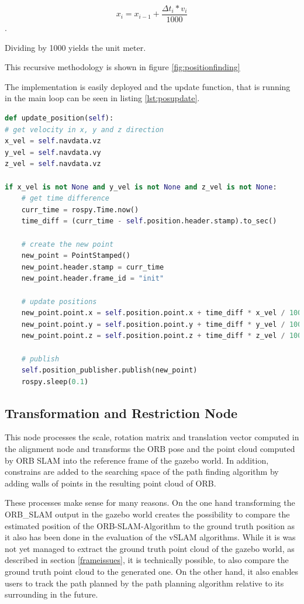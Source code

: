 	$$x_{i} = x_{i-1} + \frac{\Delta t_i * v_i}{1000} $$. 
	
	Dividing by 1000 yields the unit meter. 
	
	This recursive methodology is shown in figure \ref{fig:positionfinding}
	
	
	The implementation is easily deployed and the update function, that is running in the main loop can be seen in listing \ref{lst:posupdate}. 
	
	\begin{lstlisting}[language=python, caption=Main part of the position estimation node, label=lst:posupdate]
	def update_position(self):
# get velocity in x, y and z direction
x_vel = self.navdata.vz
y_vel = self.navdata.vy
z_vel = self.navdata.vz

if x_vel is not None and y_vel is not None and z_vel is not None:
	# get time difference
	curr_time = rospy.Time.now()
	time_diff = (curr_time - self.position.header.stamp).to_sec()
	
	# create the new point
	new_point = PointStamped()
	new_point.header.stamp = curr_time
	new_point.header.frame_id = "init"
	
	# update positions
	new_point.point.x = self.position.point.x + time_diff * x_vel / 1000
	new_point.point.y = self.position.point.y + time_diff * y_vel / 1000
	new_point.point.z = self.position.point.z + time_diff * z_vel / 1000
	
	# publish
	self.position_publisher.publish(new_point)
	rospy.sleep(0.1)
	\end{lstlisting}
	
	
	\subsection{Transformation and Restriction Node}
	
	This node processes the scale, rotation matrix and translation vector computed in the alignment node and transforms the ORB pose and the point cloud computed 
	by ORB SLAM into the reference frame of the gazebo world. In addition, constrains are added to the searching space of the path finding algorithm by adding 
	walls of points in the resulting point cloud of ORB. 
	
	These processes make sense for many reasons. On the one hand transforming the ORB\_SLAM output in the gazebo world creates the possibility to compare the 
	estimated position of the ORB-SLAM-Algorithm to the ground truth position as it also has been done in the evaluation of the vSLAM algorithms. While it is 
	was not yet managed to extract the ground truth point cloud of the gazebo world, as described in section \ref{frameissues}, it is technically possible, to also 
	compare the ground truth point cloud to the generated one. On the other hand, it also enables users to track the path planned by the path planning algorithm relative
	to its surrounding in the future. 
	
